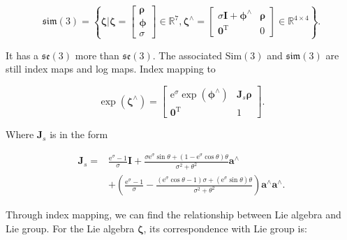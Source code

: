 \begin{equation}
\mathfrak{sim} \left( 3 \right) = \left\{ { \boldsymbol{\zeta} | \boldsymbol{\zeta}  = \left[ \begin{array}{l}
	\boldsymbol{\rho} \\
	\boldsymbol{\phi} \\
	\sigma
	\end{array} \right] \in { \mathbb{R}^7},{ \boldsymbol{\zeta} ^ \wedge } = \left[ {\begin{array}{*{20}{c}}
		{\sigma \bm{I} + {\boldsymbol{\phi} ^ \wedge }}&\boldsymbol{\rho} \\
		{{\bm{0}^\mathrm{T}}}&0
		\end{array}} \right] \in {\mathbb{R}^{4 \times 4}}} \right\}.
\end{equation}

It has a $\mathfrak{se}(3)$ more than $\mathfrak{se}(3)$. The associated $\mathrm{Sim}(3)$ and $\mathfrak{sim}(3)$ are still index maps and log maps. Index mapping to

\begin{equation}
\exp \left( {{ \boldsymbol{\zeta} ^ \wedge }} \right) = \left[ {\begin{array}{*{20}{c}}
	{{\mathrm{e}^\sigma }\exp \left( {{ \boldsymbol{\phi} ^ \wedge }} \right)}&{ \bm{J}_s \boldsymbol{\rho} }\\
	{{\bm{0}^\mathrm{T}}}&1
	\end{array}} \right].
\end{equation}

Where $\bm{J}_s$ is in the form

\begin{align*}
{ \bm{J}_s} =& \frac{{{\mathrm{e}^\sigma } - 1}}{\sigma } \bm{I} + \frac{ \sigma {{\mathrm{e}^\sigma }\sin \theta  + \left( {1 - {\mathrm{e}^\sigma }\cos \theta } \right)\theta }}{{{\sigma ^2} + {\theta ^2}}}{\bm{a}^ \wedge }\\
&+ \left( {\frac{{{\mathrm{e}^\sigma } - 1}}{\sigma } - \frac{{\left( {{\mathrm{e}^\sigma }\cos \theta  - 1} \right)\sigma  + ({\mathrm{e}^\sigma }\sin \theta )\theta }}{{{\sigma ^2} + {\theta ^2}}}} \right){\bm{a}^ \wedge }{\bm{a}^ \wedge }.
\end{align*}

Through index mapping, we can find the relationship between Lie algebra and Lie group. For the Lie algebra $\boldsymbol{\zeta}$, its correspondence with Lie group is:

